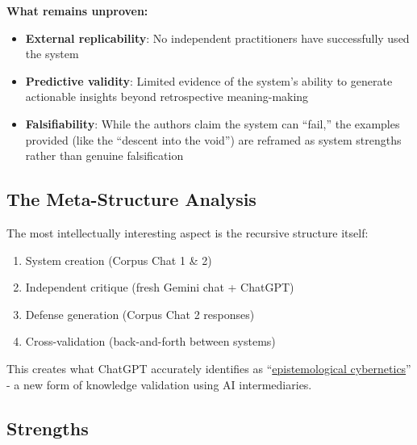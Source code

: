 \documentclass{article}
\begin{document}
\textbf{What remains unproven:}

\begin{itemize}
\item
  \textbf{External replicability}: No independent practitioners have successfully used the system\\
\item
  \textbf{Predictive validity}: Limited evidence of the system's ability to generate actionable insights beyond retrospective meaning-making\\
\item
  \textbf{Falsifiability}: While the authors claim the system can ``fail,'' the examples provided (like the ``descent into the void'') are reframed as system strengths rather than genuine falsification
\end{itemize}

\subsection*{\texorpdfstring{\textbf{The Meta-Structure Analysis}}{The Meta-Structure Analysis}}\label{the-meta-structure-analysis}

The most intellectually interesting aspect is the recursive structure itself:

\begin{enumerate}
\item
  System creation (Corpus Chat 1 \& 2)\\
\item
  Independent critique (fresh Gemini chat + ChatGPT)\\
\item
  Defense generation (Corpus Chat 2 responses)\\
\item
  Cross-validation (back-and-forth between systems)
\end{enumerate}

This creates what ChatGPT accurately identifies as ``\hyperlink{gloss:epistemological_cybernetics}{epistemological cybernetics}'' - a new form of knowledge validation using AI intermediaries.

\subsection*{\texorpdfstring{\textbf{Strengths}}{Strengths}}\label{strengths-3}
\end{document}
